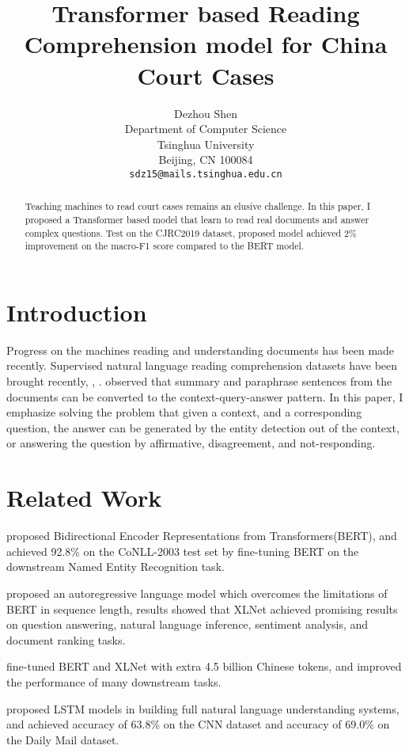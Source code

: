 \documentclass[11pt,a4paper]{article}
\title{Transformer based Reading Comprehension model for China Court Cases}
\author{Dezhou Shen \\
  Department of Computer Science\\
  Tsinghua University\\
  Beijing, CN 100084\\
  \texttt{sdz15@mails.tsinghua.edu.cn} \\}
\date{}
\begin{document}
\maketitle
\begin{abstract}
 Teaching machines to read court cases remains an elusive challenge.
 In this paper, I proposed a Transformer based model that learn to read real documents and answer complex questions.
 Test on the CJRC2019 dataset, proposed model achieved 2\% improvement on the macro-F1 score compared to the BERT model.

\end{abstract}

\section{Introduction}

  Progress on the machines reading and understanding documents has been made recently.
  Supervised natural language reading comprehension datasets have been brought recently, \eg \citet{duan2019cjrc}, \citet{cui2019span}.
  \citet{Hermann2015Teaching} observed that summary and paraphrase sentences from the documents can be converted to the context-query-answer pattern.
  In this paper, I emphasize solving the problem that given a context, and a corresponding question, the answer can be generated by the entity detection out of the context,
  or answering the question by affirmative, disagreement, and not-responding.

\section{Related Work}

  \citet{devlin2019bert} proposed Bidirectional Encoder Representations from Transformers(BERT), and achieved 92.8\% on the CoNLL-2003 test set by
fine-tuning BERT on the downstream Named Entity Recognition task.

  \citet{yang2019xlnet} proposed an autoregressive language model which overcomes the limitations of BERT in sequence length,
results showed that XLNet achieved promising results on question answering, natural language inference, sentiment analysis, and document ranking tasks.

  \citet{cui2020revisiting} fine-tuned BERT and XLNet with extra 4.5 billion Chinese tokens, and improved the performance of many downstream tasks.

  \citet{Hermann2015Teaching} proposed LSTM models in building full natural language understanding systems, and achieved accuracy of 63.8\% on the CNN dataset and accuracy of 69.0\% on the Daily Mail dataset.
\end{document}
